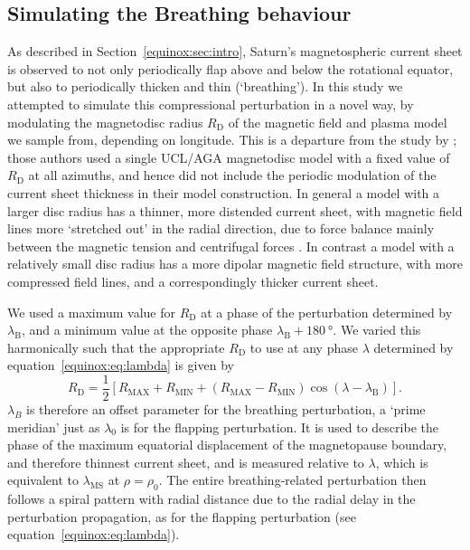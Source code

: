 \subsection{Simulating the Breathing behaviour}\label{equinox:sec:simulatingbreathing}
As described in Section~\ref{equinox:sec:intro}, Saturn's magnetospheric current sheet is observed to not only periodically flap above and below the rotational equator, but also to periodically thicken and thin (`breathing'). In this study we attempted to simulate this compressional perturbation in a novel way, by modulating the magnetodisc radius $R_\mathrm{D}$ of the magnetic field and plasma model we sample from, depending on longitude. This is a departure from the study by {\citet{achilleos2014}}; those authors used a single UCL/AGA magnetodisc model with a fixed value of $R_\mathrm{D}$ at all azimuths, and hence did not include the periodic modulation of the current sheet thickness in their model construction. In general a model with a larger disc radius has a thinner, more distended current sheet, with magnetic field lines more `stretched out' in the radial direction, due to force balance mainly between the magnetic tension and centrifugal forces \citep{achilleos2010a,sorba2017}. In contrast a model with a relatively small disc radius has a more dipolar magnetic field structure, with more compressed field lines, and a correspondingly thicker current sheet.

We used a maximum value for $R_\mathrm{D}$ at a phase of the perturbation determined by $\lambda_\mathrm{B}$, and a minimum value at the opposite phase $\lambda_\mathrm{B}+\SI{180}{\degree}$. We varied this harmonically such that the appropriate $R_\mathrm{D}$ to use at any phase $\lambda$ determined by equation~\ref{equinox:eq:lambda} is given by
\begin{equation}\label{equinox:eq:RD}
R_\mathrm{D} = \frac{1}{2}[ R_\mathrm{MAX}+R_\mathrm{MIN}+(R_\mathrm{MAX}-R_\mathrm{MIN})\cos{(\lambda - \lambda_\mathrm{B})}].
\end{equation}
$\lambda_B$ is therefore an offset parameter for the breathing perturbation, a `prime meridian' just as $\lambda_0$ is for the flapping perturbation. It is used to describe the phase of the maximum equatorial displacement of the magnetopause boundary, and therefore thinnest current sheet, and is measured relative to $\lambda$, which is equivalent to $\lambda_\mathrm{MS}$ at $\rho=\rho_0$. The entire breathing-related perturbation then follows a spiral pattern with radial distance due to the radial delay in the perturbation propagation, as for the flapping perturbation (see equation~\ref{equinox:eq:lambda}).

